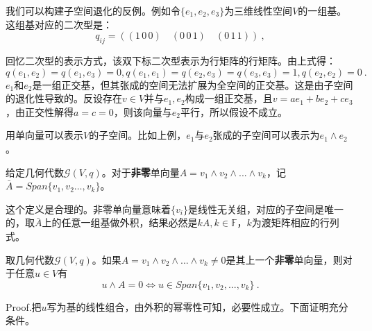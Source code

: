 我们可以构建子空间退化的反例。例如令$\{e_1,e_2,e_3\}$为三维线性空间$V$的一组基。这组基对应的二次型是：
\begin{equation}
q_{ij}=((1\,0\,0)\quad (0\,0\,1)\quad(0\,1\,1))~,
\end{equation}

回忆二次型的表示方式，该双下标二次型表示为行矩阵的行矩阵。由上式得：$$q(e_1,e_2)=q(e_1,e_3)=0,q(e_1,e_1)=q(e_2,e_3)=q(e_3,e_3)=1,q(e_2,e_2)=0~.$$
$e_1$和$e_2$是一组正交基，但其张成的空间无法扩展为全空间的正交基。这是由子空间的退化性导致的。反设存在$v\in V$并与$e_1,e_2$构成一组正交基，且$v=ae_1+be_2+ce_3$，由正交性解得$a=c=0$，则该向量与$e_2$平行，所以假设不成立。

用单向量可以表示$V$的子空间。比如上例，$e_1$与$e_2$张成的子空间可以表示为$e_1\wedge e_2$。
\begin{definition}{}
给定几何代数$\mathcal G(V,q)$。对于\textbf{非零}单向量$A=v_1\wedge v_2\wedge ...\wedge  v_k$，记$\bar{A}=Span\{v_1,v_2\dots,v_k\}$。
\end{definition}
这个定义是合理的。非零单向量意味着$\{v_i\}$是线性无关组，对应的子空间是唯一的，取$\bar A$上的任意一组基做外积，结果必然是$kA,k\in\mathbb F$，$k$为渡矩阵相应的行列式。
\begin{theorem}{}
取几何代数$\mathcal G(V,q)$。如果$A=v_1\wedge v_2\wedge...\wedge v_k \neq 0 $是其上一个\textbf{非零}单向量，则对于任意$u\in V$有
\begin{equation}
u\wedge A=0\Longleftrightarrow  u\in Span\{v_1,v_2,...,v_k\}~.
\end{equation}
\end{theorem}
Proof.把$u$写为基的线性组合，由外积的幂零性可知，必要性成立。下面证明充分条件。


